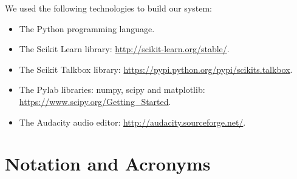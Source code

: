 \documentclass[ %
                    author={Sam Phippen},
                supervisor={Dr. Rafal Bogacz},
                     title={Real time voice activity detectors in noisy personal computing environments},
                  subtitle={},
                    degree={MEng},
                      year={2012} ]{thesis}
\begin{document}
We used the following technologies to build our system:

\begin{itemize}

    \item The Python programming language.

    \item The Scikit Learn library: \url{http://scikit-learn.org/stable/}.

    \item The Scikit Talkbox library:
        \url{https://pypi.python.org/pypi/scikits.talkbox}.

    \item The Pylab libraries: numpy, scipy and matplotlib:
        \url{https://www.scipy.org/Getting_Started}.

    \item The Audacity audio editor: \url{http://audacity.sourceforge.net/}.

\end{itemize}


\chapter*{Notation and Acronyms}

\vspace{1cm}

\noindent
\end{document}
